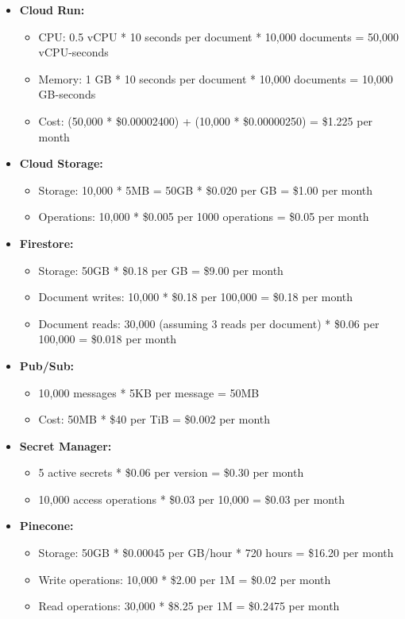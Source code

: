\documentclass[a4paper, 12pt]{report}
\begin{document}
\begin{itemize}
    \item \textbf{Cloud Run:} 
        \begin{itemize}
            \item CPU: 0.5 vCPU * 10 seconds per document * 10,000 documents = 50,000 vCPU-seconds
            \item Memory: 1 GB * 10 seconds per document * 10,000 documents = 10,000 GB-seconds
            \item Cost: (50,000 * \$0.00002400) + (10,000 * \$0.00000250) = \$1.225 per month
        \end{itemize}
    \item \textbf{Cloud Storage:} 
        \begin{itemize}
            \item Storage: 10,000 * 5MB = 50GB * \$0.020 per GB = \$1.00 per month
            \item Operations: 10,000 * \$0.005 per 1000 operations = \$0.05 per month
        \end{itemize}
    \item \textbf{Firestore:} 
        \begin{itemize}
            \item Storage: 50GB * \$0.18 per GB = \$9.00 per month
            \item Document writes: 10,000 * \$0.18 per 100,000 = \$0.18 per month
            \item Document reads: 30,000 (assuming 3 reads per document) * \$0.06 per 100,000 = \$0.018 per month
        \end{itemize}
    \item \textbf{Pub/Sub:} 
        \begin{itemize}
            \item 10,000 messages * 5KB per message = 50MB
            \item Cost: 50MB * \$40 per TiB = \$0.002 per month
        \end{itemize}
    \item \textbf{Secret Manager:} 
        \begin{itemize}
            \item 5 active secrets * \$0.06 per version = \$0.30 per month
            \item 10,000 access operations * \$0.03 per 10,000 = \$0.03 per month
        \end{itemize}
    \item \textbf{Pinecone:} 
        \begin{itemize}
            \item Storage: 50GB * \$0.00045 per GB/hour * 720 hours = \$16.20 per month
            \item Write operations: 10,000 * \$2.00 per 1M = \$0.02 per month
            \item Read operations: 30,000 * \$8.25 per 1M = \$0.2475 per month
        \end{itemize}
\end{itemize}
\end{document}
